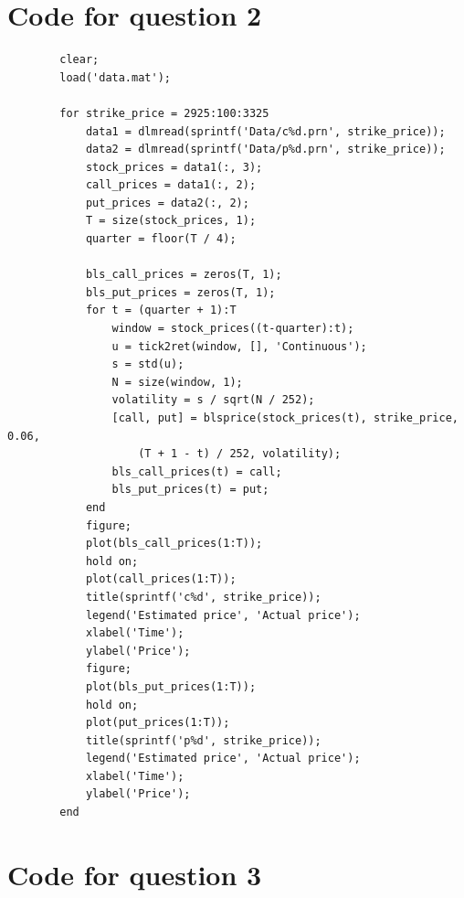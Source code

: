 \documentclass[12pt]{article}
\begin{document}
	\section{Code for question 2}

	\begin{verbatim}
		clear;
		load('data.mat');

		for strike_price = 2925:100:3325
		    data1 = dlmread(sprintf('Data/c%d.prn', strike_price));
		    data2 = dlmread(sprintf('Data/p%d.prn', strike_price));
		    stock_prices = data1(:, 3);
		    call_prices = data1(:, 2);
		    put_prices = data2(:, 2);
		    T = size(stock_prices, 1);
		    quarter = floor(T / 4);

		    bls_call_prices = zeros(T, 1);
		    bls_put_prices = zeros(T, 1);
		    for t = (quarter + 1):T
		        window = stock_prices((t-quarter):t);
		        u = tick2ret(window, [], 'Continuous');
		        s = std(u);
		        N = size(window, 1);
		        volatility = s / sqrt(N / 252);
		        [call, put] = blsprice(stock_prices(t), strike_price, 0.06,
		            (T + 1 - t) / 252, volatility);
		        bls_call_prices(t) = call;
		        bls_put_prices(t) = put;
		    end
		    figure;
		    plot(bls_call_prices(1:T));
		    hold on;
		    plot(call_prices(1:T));
		    title(sprintf('c%d', strike_price));
		    legend('Estimated price', 'Actual price');
		    xlabel('Time');
		    ylabel('Price');
		    figure;
		    plot(bls_put_prices(1:T));
		    hold on;
		    plot(put_prices(1:T));
		    title(sprintf('p%d', strike_price));
		    legend('Estimated price', 'Actual price');
		    xlabel('Time');
		    ylabel('Price');
		end
	\end{verbatim}

	\section{Code for question 3}
\end{document}
